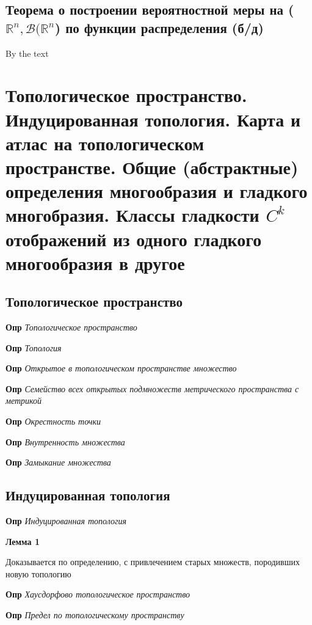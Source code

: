 \documentclass[a4paper, 14pt]{article}
\begin{document}
    \subsection{Теорема о построении вероятностной меры на ($\mathbb{R}^n, \mathcal{B}(\mathbb{R}^n$) по функции
    распределения (б/д)}
    
    By the text
    
    \section{Топологическое пространство.
    Индуцированная топология.
    Карта и атлас на топологическом пространстве.
    Общие (абстрактные) определения многообразия и гладкого многобразия.
    Классы гладкости $C^k$ отображений из одного гладкого многообразия в другое}
    
    \subsection{Топологическое пространство}
    
    \textbf{Опр} \textit{Топологическое пространство}
    
    \textbf{Опр} \textit{Топология}
    
    \textbf{Опр} \textit{Открытое в топологическом пространстве множество}
    
    \textbf{Опр} \textit{Семейство всех открытых подмножеств метрического пространства с метрикой}
    
    \textbf{Опр} \textit{Окрестность точки}
    
    \textbf{Опр} \textit{Внутренность множества}
    
    \textbf{Опр} \textit{Замыкание множества}
    
    \subsection{Индуцированная топология}
    
    \textbf{Опр} \textit{Индуцированная топология}
    
    \textbf{Лемма 1}
    
    Доказывается по определению, с привлечением старых множеств, породивших новую топологию
    
    \textbf{Опр} \textit{Хаусдорфово топологическое пространство}
    
    \textbf{Опр} \textit{Предел по топологическому пространству}
    
\end{document}
